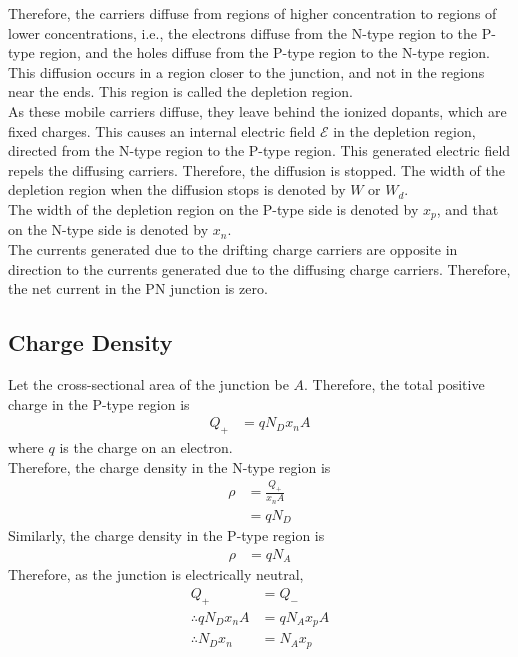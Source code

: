 \documentclass[titlepage, fleqn, a4paper, 12pt, twoside]{article}
\theoremstyle{definition}
\theoremstyle{theorem}
\begin{document}
Therefore, the carriers diffuse from regions of higher concentration to regions of lower concentrations, i.e., the electrons diffuse from the N-type region to the P-type region, and the holes diffuse from the P-type region to the N-type region.\\
This diffusion occurs in a region closer to the junction, and not in the regions near the ends.
This region is called the depletion region.\\
As these mobile carriers diffuse, they leave behind the ionized dopants, which are fixed charges.
This causes an internal electric field $\mathcal{E}$ in the depletion region, directed from the N-type region to the P-type region.
This generated electric field repels the diffusing carriers.
Therefore, the diffusion is stopped.
The width of the depletion region when the diffusion stops is denoted by $W$ or $W_d$.\\
The width of the depletion region on the P-type side is denoted by $x_p$, and that on the N-type side is denoted by $x_n$.
~\\
The currents generated due to the drifting charge carriers are opposite in direction to the currents generated due to the diffusing charge carriers.
Therefore, the net current in the PN junction is zero.\\

\subsection{Charge Density}

Let the cross-sectional area of the junction be $A$.
Therefore, the total positive charge in the P-type region is
\begin{align*}
	Q_+ & = q N_D x_n A
\end{align*}
where $q$ is the charge on an electron.\\
Therefore, the charge density in the N-type region is
\begin{align*}
	\rho & = \frac{Q_+}{x_n A} \\
             & = q N_D
\end{align*}
Similarly, the charge density in the P-type region is
\begin{align*}
	\rho & = q N_A
\end{align*}
Therefore, as the junction is electrically neutral,
\begin{align*}
	Q_+                    & = Q_-         \\
	\therefore q N_D x_n A & = q N_A x_p A \\
	\therefore N_D x_n     & = N_A x_p
\end{align*}
\end{document}
